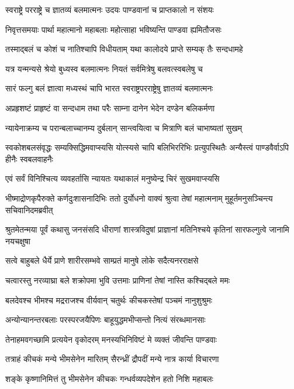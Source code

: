 \twolineshloka
{स्वराष्ट्रे परराष्ट्रे च ज्ञातव्यं बलमात्मनः}
{उदयः पाण्डवानां च प्राप्तकालो न संशयः}


\twolineshloka
{निवृत्तसमयाः पार्था महात्मानो महाबलाः}
{महोत्साहा भविष्यन्ति पाण्डवा ह्यमितौजसः}


\twolineshloka
{तस्माद्बलं च कोशं च नातिश्चापि विधीयताम्}
{यथा कालोदये प्राप्ते सम्यक् तैः सन्दधामहे}


\twolineshloka
{यत्र यन्मन्यसे श्रेयो बुध्यस्व बलमात्मनः}
{नियतं सर्वमित्रेषु बलवत्स्वबलेषु च}


\twolineshloka
{सारं फल्गु बलं ज्ञात्वा मध्यस्थं चापि भारत}
{स्वराष्ट्रपरराष्ट्रेषु ज्ञातव्यं बलमात्मनः}


\twolineshloka
{अप्रहृशष्टं प्राहृष्टं वा सन्दधाम तथा परैः}
{साम्ना दानेन भेदेन दण्डेन बलिकर्मणा}


\twolineshloka
{न्यायेनाक्रम्य च परान्बलाच्चानम्य दुर्बलान्}
{सान्त्वयित्वा च मित्राणि बलं चाभाष्यतां सुखम्}


\threelineshloka
{स्वकोशबलसंवृद्धः सम्यक्सिद्धिमवाप्स्यसि}
{योत्स्यसे चापि बलिभिररिभिः प्रत्युपस्थितैः}
{अन्यैस्त्वं पाण्डवैर्वाऽपि हीनैः स्वबलवाहनैः}


\twolineshloka
{एवं सर्वं विनिश्चित्य व्यवहर्तासि न्यायतः}
{यथाकालं मनुष्येन्द्र चिरं सुखमवाप्स्यसि}


\threelineshloka
{भीष्माद्रोणकृपैरुक्ते कर्णदुःशासनादिभिः}
{ततो दुर्योधनो वाक्यं श्रुत्वा तेषां महात्मनाम्}
{मुहूर्तमनुसञ्चिन्त्य सचिवानिदमब्रवीत्}


\threelineshloka
{श्रुतमेतन्मया पूर्वं कथासु जनसंसदि}
{धीराणां शास्त्रविदुषां प्राज्ञानां मतिनिश्चये}
{कृतिनां सारफल्गुत्वे जानामि नयचक्षुषा}


\twolineshloka
{सत्वे बाहुबले धैर्ये प्राणे शारीरसम्भवे}
{साम्प्रतं मानुषे लोके सदैत्यनरराक्षसे}


\twolineshloka
{चत्वारस्तु नरव्याघ्रा बले शक्रोपमा भुवि}
{उत्तमाः प्राणिनां तेषां नास्ति कश्चिद्बले ममः}


\twolineshloka
{बलदेवश्च भीमश्च मद्रराजश्च वीर्यवान्}
{चतुर्थः कीचकस्तेषां पञ्चमं नानुशुश्रुमः}


\twolineshloka
{अन्योन्यानन्तरबलाः परस्परजयैपिणः}
{बाहूयुद्धमभीप्सन्तो नित्यं संरब्धमानसाः}


\twolineshloka
{तेनाहमवगच्छामि प्रत्ययेन वृकोदरम्}
{मनस्यभिनिविष्टं मे व्यक्तं जीवन्ति पाण्डवाः}


\twolineshloka
{तत्राहं कीचकं मन्ये भीमसेनेन मारितम्}
{सैरन्ध्रीं द्रौपदीं मन्ये नात्र कार्या विचारणा}


\twolineshloka
{शङ्के कृष्णानिमित्तं तु भीमसेनेन कीचकः}
{गन्धर्वव्यपदेशेन हतो निशि महाबलः}


